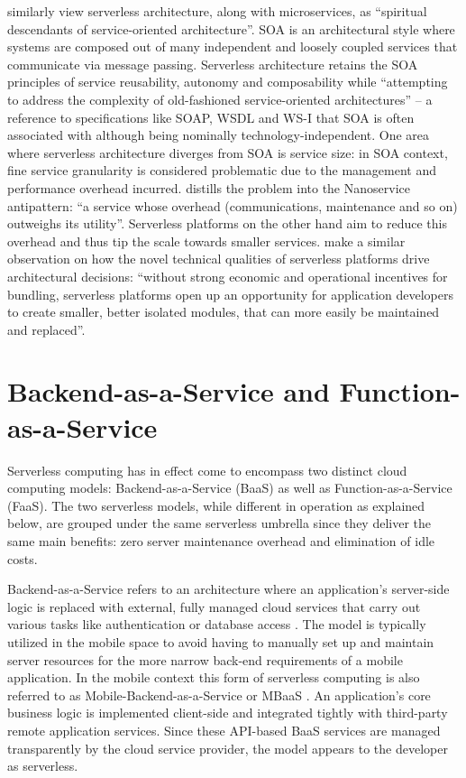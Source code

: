 \textcite{sbarski2017serverless} similarly view serverless architecture, along with microservices, as ``spiritual descendants of service-oriented architecture''. SOA is an architectural style where systems are composed out of many independent and loosely coupled services that communicate via message passing. Serverless architecture retains the SOA principles of service reusability, autonomy and composability while ``attempting to address the complexity of old-fashioned service-oriented architectures'' -- a reference to specifications like SOAP, WSDL and WS-I that SOA is often associated with although being nominally technology-independent. One area where serverless architecture diverges from SOA is service size: in SOA context, fine service granularity is considered problematic due to the management and performance overhead incurred. \textcite{rotem12soa} distills the problem into the Nanoservice antipattern: ``a service whose overhead (communications, maintenance and so on) outweighs its utility''. Serverless platforms on the other hand aim to reduce this overhead and thus tip the scale towards smaller services. \textcite{adzic2017serverless} make a similar observation on how the novel technical qualities of serverless platforms drive architectural decisions: ``without strong economic and operational incentives for bundling, serverless platforms open up an opportunity for application developers to create smaller, better isolated modules, that can more easily be maintained and replaced''.

\section{Backend-as-a-Service and Function-as-a-Service} \label{sec:faasbaas}

Serverless computing has in effect come to encompass two distinct cloud computing models: Backend-as-a-Service (BaaS) as well as Function-as-a-Service (FaaS). The two serverless models, while different in operation as explained below, are grouped under the same serverless umbrella since they deliver the same main benefits: zero server maintenance overhead and elimination of idle costs. \parencite{cncf18serverlessWG}

Backend-as-a-Service refers to an architecture where an application's server-side logic is replaced with external, fully managed cloud services that carry out various tasks like authentication or database access \parencite{buyya2017manifesto}. The model is typically utilized in the mobile space to avoid having to manually set up and maintain server resources for the more narrow back-end requirements of a mobile application. In the mobile context this form of serverless computing is also referred to as Mobile-Backend-as-a-Service or MBaaS \parencite{baldini17currentTrends}. An application's core business logic is implemented client-side and integrated tightly with third-party remote application services. Since these API-based BaaS services are managed transparently by the cloud service provider, the model appears to the developer as serverless.

